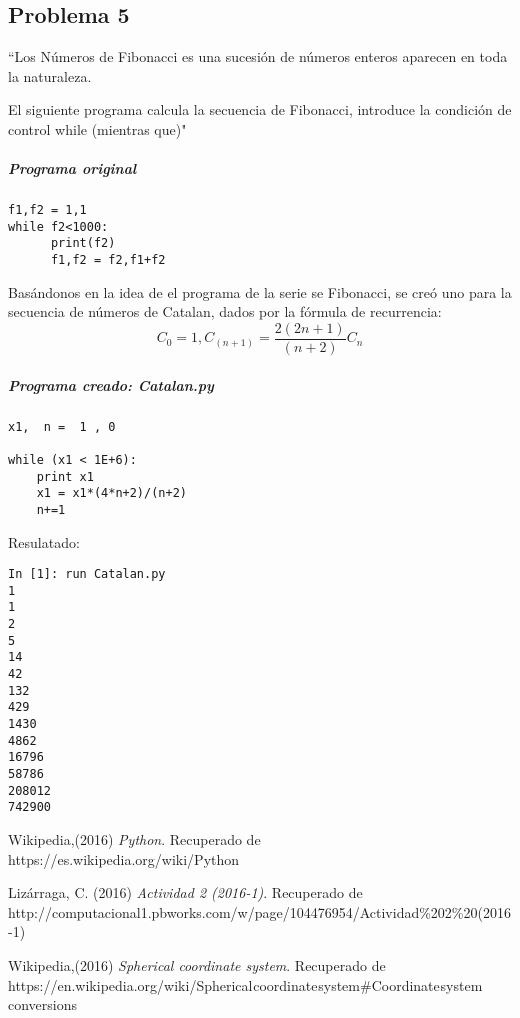\documentclass[12pt]{article}
\begin{document}
\subsection{Problema 5}

``Los Números de Fibonacci  es una sucesión de números enteros aparecen en toda la naturaleza.  
 
El siguiente programa calcula la secuencia de Fibonacci, introduce la condición de control while (mientras que)"
\subparagraph*{Programa original}
\begin{verbatim}
f1,f2 = 1,1
while f2<1000:
      print(f2)
      f1,f2 = f2,f1+f2
\end{verbatim}
Basándonos en la idea de el programa de la serie se Fibonacci, se creó uno para la secuencia de números de Catalan, dados por la fórmula de recurrencia:
\begin{equation*}
C_0=1, C_{(n+1)} = \frac{2(2n+1)}{(n+2)}C_n
\end{equation*}

\subparagraph*{Programa creado: Catalan.py}
\begin{verbatim}
x1,  n =  1 , 0

while (x1 < 1E+6):
    print x1
    x1 = x1*(4*n+2)/(n+2)
    n+=1
\end{verbatim}
\pagebreak
Resulatado:
\begin{verbatim}
In [1]: run Catalan.py
1
1
2
5
14
42
132
429
1430
4862
16796
58786
208012
742900
\end{verbatim}

\begin{thebibliography}{6}

	Wikipedia,(2016)
	\emph{Python}. Recuperado de\\ https://es.wikipedia.org/wiki/Python

	Lizárraga, C. (2016)
	\emph{Actividad 2 (2016-1)}. Recuperado de\\ http://computacional1.pbworks.com/w/page/104476954/Actividad\%202\%20(2016-1)
	
	Wikipedia,(2016)
	\emph{Spherical coordinate system}. Recuperado de\\ 
	https://en.wikipedia.org/wiki/Spherical$_{}$coordinate$_{}$system\#Coordinate$_{}$system$_{}$conversions

\end{thebibliography}
\end{document}
